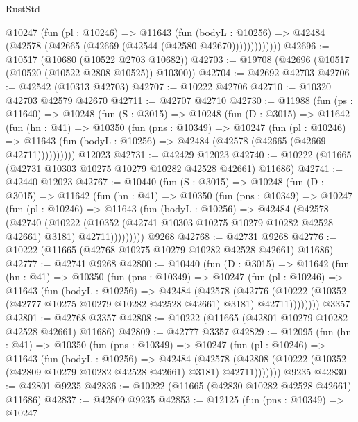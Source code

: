 \begin{lexlean}{RustStd}
\begin{coremodule}
              @10247
                (fun (pl : @10246) =>
                @11643
                  (fun (bodyL : @10256) =>
                  @42484 (@42578 (@42665 (@42669 (@42544 (@42580 @42670)))))))))))))
@42696 := @10517 (@10680 (@10522 @2703 @10682))
@42703 := @19708 (@42696 (@10517 (@10520 (@10522 @2808 @10525)) @10300))
@42704 := @42692 @42703
@42706 := @42542 (@10313 @42703)
@42707 := @10222 @42706
@42710 := @10320 @42703 @42579 @42670
@42711 := @42707 @42710
@42730 := @11988
    (fun (ps : @11640) =>
    @10248
      (fun (S : @3015) =>
      @10248
        (fun (D : @3015) =>
        @11642
          (fun (hn : @41) =>
          @10350
            (fun (pns : @10349) =>
            @10247
              (fun (pl : @10246) =>
              @11643 (fun (bodyL : @10256) => @42484 (@42578 (@42665 (@42669 @42711))))))))))
    @12023
@42731 := @42429 @12023
@42740 := @10222 (@11665 (@42731 @10303 @10275 @10279 @10282 @42528 @42661) @11686)
@42741 := @42440 @12023
@42767 := @10440
    (fun (S : @3015) =>
    @10248
      (fun (D : @3015) =>
      @11642
        (fun (hn : @41) =>
        @10350
          (fun (pns : @10349) =>
          @10247
            (fun (pl : @10246) =>
            @11643
              (fun (bodyL : @10256) =>
              @42484
                (@42578
                  (@42740
                    (@10222
                      (@10352 (@42741 @10303 @10275 @10279 @10282 @42528 @42661) @3181)
                      @42711)))))))))
    @9268
@42768 := @42731 @9268
@42776 := @10222 (@11665 (@42768 @10275 @10279 @10282 @42528 @42661) @11686)
@42777 := @42741 @9268
@42800 := @10440
    (fun (D : @3015) =>
    @11642
      (fun (hn : @41) =>
      @10350
        (fun (pns : @10349) =>
        @10247
          (fun (pl : @10246) =>
          @11643
            (fun (bodyL : @10256) =>
            @42484
              (@42578
                (@42776
                  (@10222 (@10352 (@42777 @10275 @10279 @10282 @42528 @42661) @3181) @42711))))))))
    @3357
@42801 := @42768 @3357
@42808 := @10222 (@11665 (@42801 @10279 @10282 @42528 @42661) @11686)
@42809 := @42777 @3357
@42829 := @12095
    (fun (hn : @41) =>
    @10350
      (fun (pns : @10349) =>
      @10247
        (fun (pl : @10246) =>
        @11643
          (fun (bodyL : @10256) =>
          @42484
            (@42578
              (@42808 (@10222 (@10352 (@42809 @10279 @10282 @42528 @42661) @3181) @42711)))))))
    @9235
@42830 := @42801 @9235
@42836 := @10222 (@11665 (@42830 @10282 @42528 @42661) @11686)
@42837 := @42809 @9235
@42853 := @12125
    (fun (pns : @10349) =>
    @10247

\end{coremodule}
\end{lexlean}
